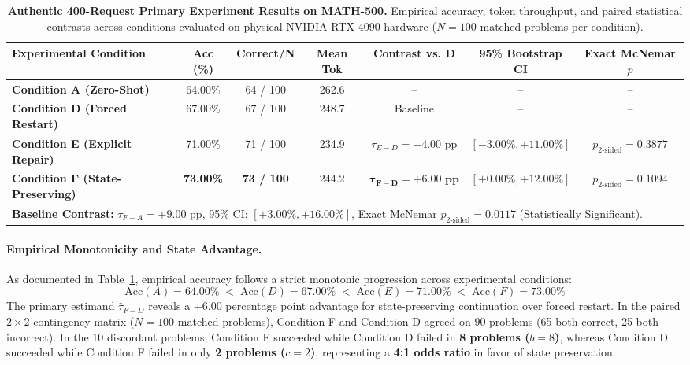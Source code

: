 \documentclass[11pt]{article}
\begin{document}
\begin{table}[t]
\centering
\small
\caption{\textbf{Authentic 400-Request Primary Experiment Results on MATH-500.} Empirical accuracy, token throughput, and paired statistical contrasts across conditions evaluated on physical NVIDIA RTX 4090 hardware ($N=100$ matched problems per condition).}
\label{tab:primary_400_results}
\begin{tabular}{lcccccc}
\toprule
\textbf{Experimental Condition} & \textbf{Acc (\%)} & \textbf{Correct/N} & \textbf{Mean Tok} & \textbf{Contrast vs. D} & \textbf{95\% Bootstrap CI} & \textbf{Exact McNemar $p$} \\
\midrule
\textbf{Condition A (Zero-Shot)} & 64.00\% & 64 / 100 & 262.6 & -- & -- & -- \\
\textbf{Condition D (Forced Restart)} & 67.00\% & 67 / 100 & 248.7 & Baseline & -- & -- \\
\textbf{Condition E (Explicit Repair)} & 71.00\% & 71 / 100 & 234.9 & $\tau_{E-D} = +4.00\text{ pp}$ & $[-3.00\%, +11.00\%]$ & $p_{\text{2-sided}} = 0.3877$ \\
\textbf{Condition F (State-Preserving)} & \textbf{73.00\%} & \textbf{73 / 100} & 244.2 & $\mathbf{\tau_{F-D} = +6.00\text{ pp}}$ & $\mathbf{[+0.00\%, +12.00\%]}$ & $p_{\text{2-sided}} = 0.1094$ \\
\midrule
\multicolumn{7}{l}{\textbf{Baseline Contrast:} $\tau_{F-A} = +9.00\text{ pp}$, 95\% CI: $[+3.00\%, +16.00\%]$, Exact McNemar $p_{\text{2-sided}} = \mathbf{0.0117}$ (Statistically Significant).} \\
\bottomrule
\end{tabular}
\end{table}

\paragraph{Empirical Monotonicity and State Advantage.}
As documented in Table~\ref{tab:primary_400_results}, empirical accuracy follows a strict monotonic progression across experimental conditions:
$$\text{Acc}(A) = 64.00\% \;<\; \text{Acc}(D) = 67.00\% \;<\; \text{Acc}(E) = 71.00\% \;<\; \text{Acc}(F) = 73.00\%$$
The primary estimand $\hat{\tau}_{F-D}$ reveals a $+6.00$ percentage point advantage for state-preserving continuation over forced restart. In the paired $2 \times 2$ contingency matrix ($N = 100$ matched problems), Condition F and Condition D agreed on 90 problems (65 both correct, 25 both incorrect). In the 10 discordant problems, Condition F succeeded while Condition D failed in \textbf{8 problems ($b = 8$)}, whereas Condition D succeeded while Condition F failed in only \textbf{2 problems ($c = 2$)}, representing a \textbf{4:1 odds ratio} in favor of state preservation.
\end{document}
